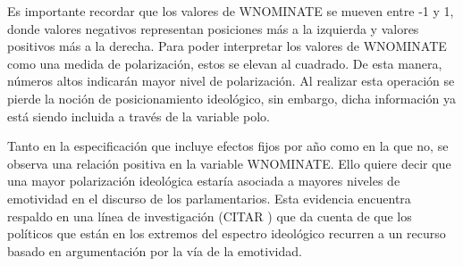 \documentclass[
  12pt,
]{article}
\begin{document}
Es importante recordar que los valores de WNOMINATE se mueven entre -1 y
1, donde valores negativos representan posiciones más a la izquierda y
valores positivos más a la derecha. Para poder interpretar los valores
de WNOMINATE como una medida de polarización, estos se elevan al
cuadrado. De esta manera, números altos indicarán mayor nivel de
polarización. Al realizar esta operación se pierde la noción de
posicionamiento ideológico, sin embargo, dicha información ya está
siendo incluida a través de la variable polo.

Tanto en la especificación que incluye efectos fijos por año como en la
que no, se observa una relación positiva en la variable WNOMINATE. Ello
quiere decir que una mayor polarización ideológica estaría asociada a
mayores niveles de emotividad en el discurso de los parlamentarios. Esta
evidencia encuentra respaldo en una línea de investigación (CITAR ) que
da cuenta de que los políticos que están en los extremos del espectro
ideológico recurren a un recurso basado en argumentación por la vía de
la emotividad.
\end{document}
